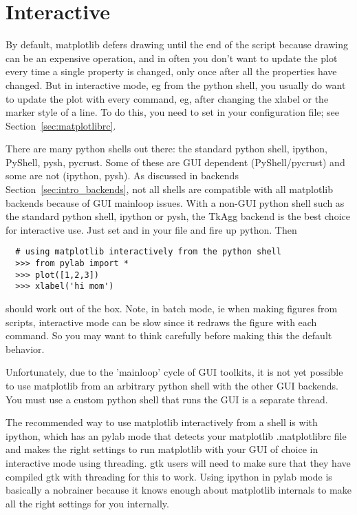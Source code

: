 \documentclass[twoside]{book}
\begin{document}
\section{Interactive}
\label{sec:interactive}

By default, matplotlib defers drawing until the end of the script
because drawing can be an expensive operation, and in often you don't
want to update the plot every time a single property is changed, only
once after all the properties have changed.  But in interactive mode,
eg from the python shell, you usually do want to update the plot with
every command, eg, after changing the xlabel or the marker style of a
line.  To do this, you need to set  in your
configuration file; see Section~\ref{sec:matplotlibrc}.

There are many python shells out there: the standard python shell,
ipython, PyShell, pysh, pycrust.  Some of these are GUI dependent
(PyShell/pycrust) and some are not (ipython, pysh).  As discussed in
backends Section~\ref{sec:intro_backends}, not all shells are compatible
with all matplotlib backends because of GUI mainloop issues.  With a
non-GUI python shell such as the standard python shell, ipython or
pysh, the TkAgg backend is the best choice for interactive use.  Just
set  and  in your
file and fire up python.  Then

\begin{lstlisting}
  # using matplotlib interactively from the python shell
  >>> from pylab import *
  >>> plot([1,2,3])
  >>> xlabel('hi mom')
\end{lstlisting}

\noindent should work out of the box.  Note, in batch mode, ie when making
figures from scripts, interactive mode can be slow since it redraws
the figure with each command.  So you may want to think carefully
before making this the default behavior.

Unfortunately, due to the 'mainloop' cycle of GUI toolkits, it is not
yet possible to use matplotlib from an arbitrary python shell with the
other GUI backends.  You must use a custom python shell that runs the
GUI is a separate thread.

The recommended way to use matplotlib interactively from a shell is
with ipython, which has an pylab
mode that detects your matplotlib .matplotlibrc file and makes the right settings
to run matplotlib with your GUI of choice in interactive mode using
threading.  gtk users will need to make sure that they have compiled
gtk with threading for this to work.  Using ipython in pylab mode is
basically a nobrainer because it knows enough about matplotlib
internals to make all the right settings for you internally.
\end{document}
